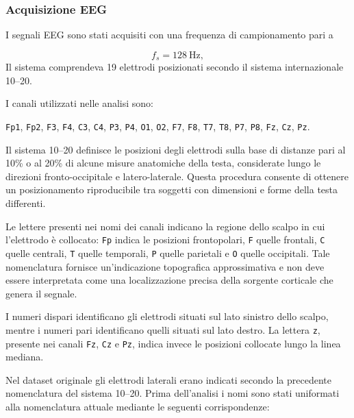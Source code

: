\subsubsection{Acquisizione EEG}

I segnali EEG sono stati acquisiti con una frequenza di campionamento
pari a

\begin{equation}
	f_s = 128 \ \text{Hz},
\end{equation}
Il sistema comprendeva
19 elettrodi posizionati secondo il sistema internazionale 10--20.

I canali utilizzati nelle analisi sono:

\begin{center}
	\texttt{Fp1}, \texttt{Fp2}, \texttt{F3}, \texttt{F4},
	\texttt{C3}, \texttt{C4}, \texttt{P3}, \texttt{P4},
	\texttt{O1}, \texttt{O2}, \texttt{F7}, \texttt{F8},
	\texttt{T7}, \texttt{T8}, \texttt{P7}, \texttt{P8},
	\texttt{Fz}, \texttt{Cz}, \texttt{Pz}.
\end{center}

Il sistema 10--20 definisce le posizioni degli elettrodi sulla base
di distanze pari al 10\% o al 20\% di alcune misure anatomiche della
testa, considerate lungo le direzioni fronto-occipitale e
latero-laterale. Questa procedura consente di ottenere un
posizionamento riproducibile tra soggetti con dimensioni e forme
della testa differenti.

Le lettere presenti nei nomi dei canali indicano la regione dello
scalpo in cui l'elettrodo è collocato: \texttt{Fp} indica le
posizioni frontopolari, \texttt{F} quelle frontali, \texttt{C}
quelle centrali, \texttt{T} quelle temporali, \texttt{P} quelle
parietali e \texttt{O} quelle occipitali. Tale nomenclatura fornisce
un'indicazione topografica approssimativa e non deve essere
interpretata come una localizzazione precisa della sorgente corticale
che genera il segnale.

I numeri dispari identificano gli elettrodi situati sul lato sinistro
dello scalpo, mentre i numeri pari identificano quelli situati sul
lato destro. La lettera \texttt{z}, presente nei canali
\texttt{Fz}, \texttt{Cz} e \texttt{Pz}, indica invece le posizioni
collocate lungo la linea mediana.

Nel dataset originale gli elettrodi laterali erano indicati secondo
la precedente nomenclatura del sistema 10--20. Prima dell'analisi i
nomi sono stati uniformati alla nomenclatura attuale mediante le
seguenti corrispondenze:

